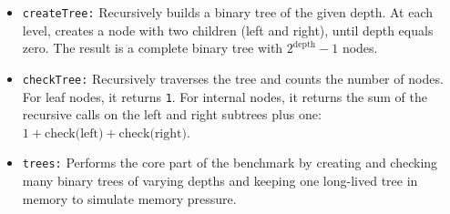 \begin{itemize}
  \item \texttt{createTree:} Recursively builds a binary tree of the given depth. At each level, creates a node with two children (left and right), until depth equals zero. The result is a complete binary tree with \(2^{\text{depth}} - 1\) nodes.
 
  \item \texttt{checkTree:} Recursively traverses the tree and counts the number of nodes. For leaf nodes, it returns \texttt{1}. For internal nodes, it returns the sum of the recursive calls on the left and right subtrees plus one: $1 + \text{check(left)} + \text{check(right)}$.
  
  \item \texttt{trees:} Performs the core part of the benchmark by creating and checking many binary trees of varying depths and keeping one long-lived tree in memory to simulate memory pressure.
\end{itemize}

